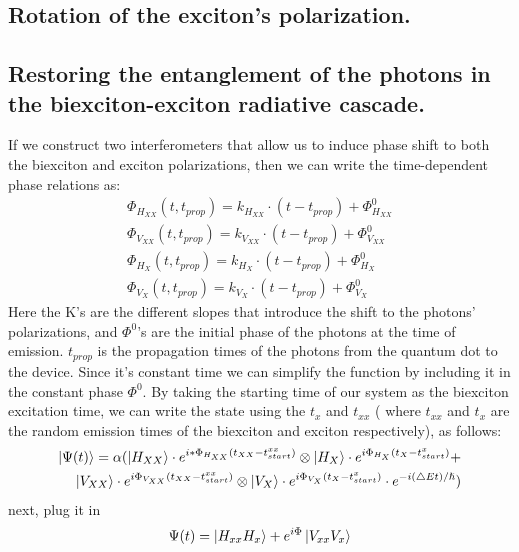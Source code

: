 \subsection{Rotation of the exciton's polarization.}
\subsection{Restoring the entanglement of the photons in the biexciton-exciton radiative cascade.}

If we construct two interferometers that allow us to induce phase shift to both the biexciton and exciton polarizations, then we can write the time-dependent phase relations as: 
\begin{equation}
\begin{aligned} 
		&\Phi_{H_{XX}}{(t,t_{prop})} = k_{H_{XX}}\cdot(t-t_{prop}) + \Phi^0_{H_{XX}} & \\	&\Phi_{V_{XX}}{(t,t_{prop})} = k_{V_{XX}}\cdot(t-t_{prop}) + \Phi^0_{V_{XX}} \\
        &\Phi_{H_{X}}{(t,t_{prop})} = k_{H_{X}}\cdot(t-t_{prop}) + \Phi^0_{H_{X}} &\\
		&\Phi_{V_{X}}{(t,t_{prop})} = k_{V_{X}}\cdot(t-t_{prop}) + \Phi^0_{V_{X}} 
\end{aligned}
\end{equation}
Here the  K's are the different slopes that introduce the shift to the photons' polarizations, and  $\Phi^0$'s are the initial phase of the photons at the time of emission. $t_{prop}$ is the propagation times of the photons from the quantum dot to the device. Since it's constant time we can simplify the function by including it in the constant phase $\Phi^0$.
By taking the starting time of our system as the biexciton excitation time, we can write the state using the $t_x$ and $t_{xx}$ ( where $t_{xx}$ and $t_{x}$ are the random emission times of the biexciton and exciton respectively), as follows:
\begin{equation}
\begin{split}
		\ket{\Psi(t)}= \alpha(\ket{H_{XX}}\cdot e^{i*\Phi_{H_{XX}}(t_{XX}-t^{xx}_{start})} \otimes 
		\ket{H_{X}}\cdot e^{i\Phi_{H_{X}}(t_{X}-t^{x}_{start})}+\\
        \ket{V_{XX}}\cdot e^{i\Phi_{V_{XX}}(t_{XX}-t^{xx}_{start})} \otimes 
		\ket{V_{X}}\cdot e^{i\Phi_{V_{X}}(t_{X}-t^{x}_{start})}\cdot e^{-i(\triangle Et)/\hslash})	
  \end{split}
\end{equation} 
next, plug it in
\begin{equation}
	\Psi(t) = \ket{H_{xx}H_x}+e^{i\Phi}\ket{V_{xx}V_x}
\end{equation}
